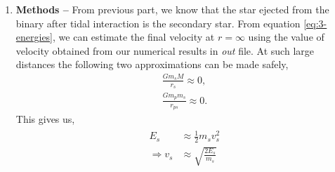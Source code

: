 \documentclass[a4paper]{article}
\begin{document}
\begin{enumerate} [label*=\textbf{(\alph*)}]
					The total energy of the binary, which is the sum of the energies of the two stars is conserved over time and is roughly zero. After time \(t=0\), when the binary reaches the periastron, the energy of primary star becomes extremely negative, while the energy of the secondary star becomes extremely positive. This indicates that orbit of primary star becomes more bound to the black hole and vice versa. This suggests more strongly that deviations in orbits of stars of the binary are essentially due to gravitational interactions between binary and black hole, in case the point of approach is closer than some limiting value, decided by the value of penetration factor, \(D\). 
					
				\item
					\subitem \textbf{Methods --}
					From previous part, we know that the star ejected from the binary after tidal interaction is the secondary star. From equation \ref{eq:3-energies}, we can estimate the final velocity at \(r=\infty\) using the value of velocity obtained from our numerical results in \emph{out} file. At such large distances the following two approximations can be made safely,
					\begin{equation}
						\begin{gathered}
							\frac{G m_s M}{r_s} \approx 0, \\
							\frac{G m_p m_s}{r_{ps}} \approx 0 .
						\end{gathered}
					\end{equation}
					This gives us,
					\begin{equation}
						\begin{gathered}
							\begin{aligned}
								E_s &\approx \frac{1}{2} m_s v_s^2 \\
								\Rightarrow v_s &\approx \sqrt{\frac{2 E_s}{m_s}}
							\end{aligned}
						\end{gathered}
						\label{eq:3-secondary_velocity_infty}
					\end{equation}
				

\end{enumerate}
\end{document}
